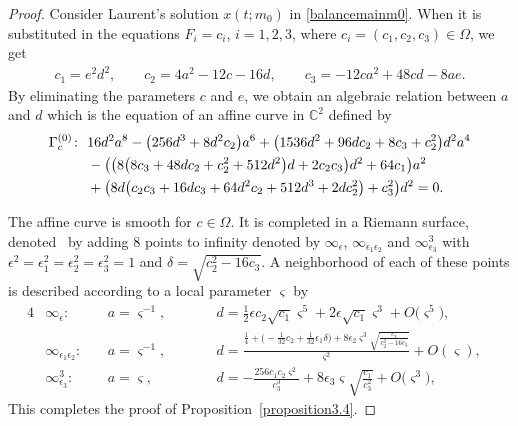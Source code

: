\documentclass[pdftex]{sigma}
\numberwithin{equation}{section}
\begin{document}
\begin{proof}
 Consider Laurent's solution $x(t;m_0)$ in \eqref{balancemainm0}.
 When it is substituted in the equations $F_i=c_i$, $i=1,2,3$, where $c_i=(c_1,c_2,c_3)\in \Omega$, we get
\begin{gather*}
 c_1 = e^2d^2, \qquad
 c_2 = 4a^2-12c-16d, \qquad
 c_3 = -12ca^2+48cd-8ae.
\end{gather*}
By eliminating the parameters $c$ and $e$, we obtain an algebraic
relation between $a$ and $d$ which is the equation of an affine
curve in $\mathbb{C}^2$ defined by
\begin{gather*}
\begin{split}
& \Gamma_c^{(0)}\colon \ 16d^2a^8-\bigl(256d^3+8d^2c_2\bigr)a^6+\bigl(1536d^2+96dc_2+8c_3+c_2^2\bigr)d^2a^4\\
&\hphantom{\Gamma_c^{(0)}\colon} \ {} -\bigl(\bigl(8\bigl(8c_3+48dc_2+c_2^2+512d^2\bigr)d+2c_2c_3\bigr)d^2+64c_1\bigr)a^2\\
& \hphantom{\Gamma_c^{(0)}\colon} \ {} +\bigl(8d\bigl(c_2c_3+16dc_3+64d^2c_2 +512d^3+2dc_2^2\bigr)+c_3^2\bigr)d^2=0.
\end{split}
\end{gather*}

The affine curve  is smooth for $c\in
\Omega$. It is completed in a Riemann surface, denoted~ by adding $8$ points to
infinity denoted by $\infty_{\epsilon}$,
$\infty_{\epsilon_1\epsilon_2}$ and $\infty^3_{\epsilon_3}$ with
$\epsilon^2=\epsilon_1^2=\epsilon_2^2=\epsilon_3^2=1$ and
$\delta=\sqrt{c_2^2-16c_3}$. A neighborhood of each of these points
is described according to a local parameter $\varsigma$ by
\begin{alignat}{4}
& \infty_{\epsilon}\colon \ && a =\varsigma^{-1},\qquad && d
=\frac{1}{2}\epsilon c_2\sqrt{c_1}\varsigma^5+
2\epsilon\sqrt{c_1}\varsigma^3 + O\bigl(\varsigma^5\bigr), &\label{valeurde_inftyvarepsilon_D0}\\
& \infty_{\epsilon_1\epsilon_2}\colon \ && a =\varsigma^{-1},\qquad && d
=\frac{\frac{1}{4}+\bigl(-\frac{1}{32}c_2+\frac{1}{32}\epsilon_1\delta\bigr)
+8\epsilon_2\varsigma^3\sqrt{\frac{c_1}{c_2^2-16c_3}}}{\varsigma^2}+O(\varsigma), &\label{valeurde_inftyvarepsilon1epsilon2_D0}\\
& \infty^3_{\epsilon_3}\colon \ && a =\varsigma,\qquad && d
=-\frac{256c_1c_2\varsigma^2}{c_3^3}+8\epsilon_3\varsigma\sqrt{\frac{c_1}{c_3^2}}+O\bigl(\varsigma^3\bigr), &\label{valeurde_inftyvarepsilon3_D0}
\end{alignat}
This completes the proof of Proposition~\ref{proposition3.4}.
\end{proof}
\end{document}
